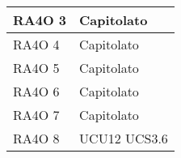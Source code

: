 \begin{center}
\begin{longtable}{ | p{5cm} | p{5cm} |}
        RA4O 3 &  Capitolato \newline  \\ \hline      
        RA4O 4 &  Capitolato \newline  \\ \hline      
        RA4O 5 &  Capitolato \newline  \\ \hline      
        RA4O 6 &  Capitolato \newline  \\ \hline      
        RA4O 7 &  Capitolato \newline  \\ \hline      
        RA4O 8 &  UCU12 \newline  UCS3.6 \newline  \\ \hline     
      \end{longtable}
      \egroup
      \end{center}  
\clearpage


